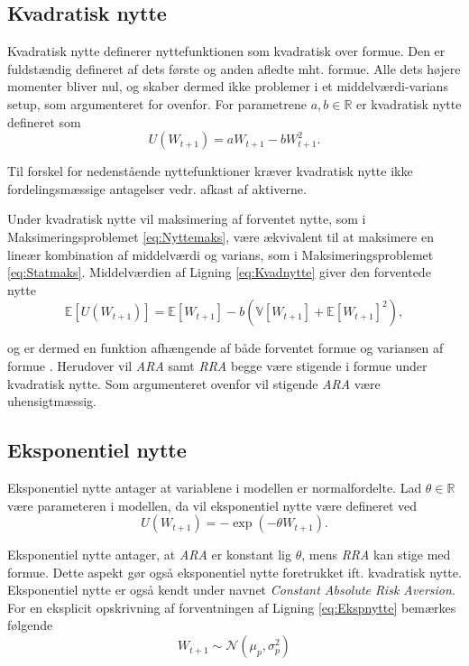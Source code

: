 \documentclass[
  a4paper,
  oneside]{memoir}
\begin{document}
\hypertarget{kvadratisk-nytte}{%
\subsection{Kvadratisk nytte}\label{kvadratisk-nytte}}

Kvadratisk nytte definerer nyttefunktionen som kvadratisk over formue. Den er fuldstændig defineret af dets første og anden afledte mht. formue. Alle dets højere momenter bliver nul, og skaber dermed ikke problemer i et middelværdi-varians setup, som argumenteret for ovenfor. For parametrene \(a,b\in\mathbb{R}\) er kvadratisk nytte defineret som
\begin{equation}
U(W_{t+1})=aW_{t+1}-bW_{t+1}^2. \label{eq:Kvadnytte}
\end{equation}

Til forskel for nedenstående nyttefunktioner kræver kvadratisk nytte ikke fordelingsmæssige antagelser vedr. afkast af aktiverne.

Under kvadratisk nytte vil maksimering af forventet nytte, som i Maksimeringsproblemet \eqref{eq:Nyttemaks}, være ækvivalent til at maksimere en lineær kombination af middelværdi og varians, som i Maksimeringsproblemet \eqref{eq:Statmaks}. Middelværdien af Ligning \eqref{eq:Kvadnytte} giver den forventede nytte
\[\mathbb{E}[U(W_{t+1})]=\mathbb{E}[W_{t+1}]-b(\mathbb{V}[W_{t+1}]+\mathbb{E}[W_{t+1}]^2),\]

og er dermed en funktion afhængende af både forventet formue og variansen af formue \citep{Munk2017}. Herudover vil \emph{ARA} samt \emph{RRA} begge være stigende i formue under kvadratisk nytte. Som argumenteret ovenfor vil stigende \emph{ARA} være uhensigtmæssig.

\hypertarget{eksponentiel-nytte}{%
\subsection{Eksponentiel nytte}\label{eksponentiel-nytte}}

Eksponentiel nytte antager at variablene i modellen er normalfordelte. Lad \(\theta\in\mathbb{R}\) være parameteren i modellen, da vil eksponentiel nytte være defineret ved
\begin{equation}
U(W_{t+1})=-\exp\left(-\theta W_{t+1}\right). \label{eq:Ekspnytte}
\end{equation}

Eksponentiel nytte antager, at \emph{ARA} er konstant lig \(\theta\), mens \emph{RRA} kan stige med formue. Dette aspekt gør også eksponentiel nytte foretrukket ift. kvadratisk nytte. Eksponentiel nytte er også kendt under navnet \emph{Constant Absolute Risk Aversion}. For en eksplicit opskrivning af forventningen af Ligning \eqref{eq:Ekspnytte} bemærkes følgende
\[W_{t+1}\sim \mathcal{N}\left(\mu_p,\sigma_p^2\right)\]
\end{document}
